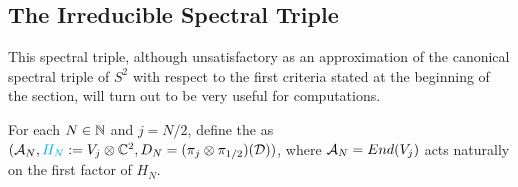 \subsection{The Irreducible Spectral Triple}
 
 


        
    
        
\linea

This spectral triple, although unsatisfactory as an approximation of the canonical spectral triple of $S^2$ with respect to the first criteria stated at the beginning of the section, will turn out to be very useful for computations.

\begin{definition}
For each $N \in \mathbb{N}$ and $j = N/2$, define the  as $(\mathcal A_N, \textcolor{cyan}{H_N} := V_j \otimes \mathbb{C}^2, D_N = (\pi_j \otimes \pi_{1/2})(\mathcal D))$, where $\mathcal A_N = End(V_j)$ acts naturally on the first factor of $H_N$.
\end{definition}

